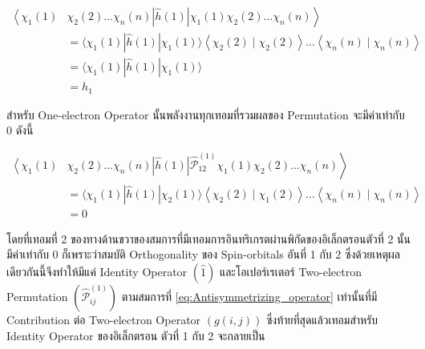 \begin{equation}
    \begin{aligned}
        \left\langle \right. \chi_1(1) & \chi_2(2) \dots \chi_n(n)
        |\hat{h}(1)|
        \chi_1(1) \chi_2(2) \dots \chi_n(n) \left. \right\rangle   \\
                                       & = \langle\chi_1(1)
        |\hat{h}(1)|
        \chi_1(1)\rangle\left\langle\chi_2(2) \mid \chi_2(2)\right\rangle
        \dots\left\langle\chi_n(n) \mid \chi_n(n)\right\rangle     \\
                                       & = \langle\chi_1(1)
        |\hat{h}(1)|
        \chi_1(1)\rangle                                           \\
                                       & = h_1
    \end{aligned}
\end{equation}

\noindent สำหรับ One-electron Operator นั้นพลังงานทุกเทอมที่รวมผลของ Permutation จะมีค่าเท่ากับ 0 ดังนี้

\begin{equation}
    \begin{aligned}
        \left\langle \right. \chi_1(1) & \chi_2(2) \dots \chi_n(n)
        |\hat{h}(1)|
        \hat{\mathscr{P}}_{12}^{(1)} \chi_1(1) \chi_2(2) \dots \chi_n(n) \left. \right\rangle \\
                                       & = \langle\chi_1(1)
        |\hat{h}(1)|
        \chi_2(1)\rangle\left\langle\chi_2(2) \mid \chi_1(2)\right\rangle
        \dots\left\langle\chi_n(n) \mid \chi_n(n)\right\rangle                                \\
                                       & = 0
    \end{aligned}
\end{equation}

\noindent โดยที่เทอมที่ 2 ของทางด้านขวาของสมการที่มีเทอมการอินทริเกรตผ่านพิกัดของอิเล็กตรอนตัวที่ 2 นั้นมีค่าเท่ากับ 0 ก็เพราะว่าสมบัติ
Orthogonality ของ Spin-orbitals อันที่ 1 กับ 2 ซึ่งด้วยเหตุผลเดียวกันนี้จึงทำให้มีแค่ Identity Operator $(\hat{1})$
และโอเปอร์เรเตอร์ Two-electron Permutation $(\hat{\mathscr{P}}_{i j}^{(1)})$ ตามสมการที่ \eqref{eq:Antisymmetrizing_operator}
เท่านั้นที่มี Contribution ต่อ Two-electron Operator $(g(i, j))$ ซึ่งท้ายที่สุดแล้วเทอมสำหรับ Identity Operator ของอิเล็กตรอน%
ตัวที่ 1 กับ 2 จะกลายเป็น

